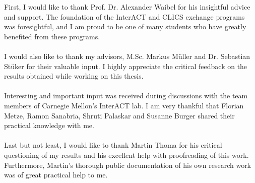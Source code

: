 \acks

First, I would like to thank Prof. Dr. Alexander Waibel for his insightful advice and support. The foundation of the InterACT and CLICS exchange programs was foresightful, and I am proud to be one of many students who have greatly benefited from these programs. \\ \\
I would also like to thank my advisors, M.Sc. Markus Müller and Dr. Sebastian Stüker for their valuable input. I highly appreciate the critical feedback on the results obtained while working on this thesis. \\ \\
Interesting and important input was received during discussions with the team members of Carnegie Mellon's InterACT lab. I am very thankful that Florian Metze, Ramon Sanabria, Shruti Palaskar and Susanne Burger shared their practical knowledge with me. \\ \\
Last but not least, I would like to thank Martin Thoma for his critical questioning of my results and his excellent help with proofreading of this work. Furthermore, Martin's thorough public documentation of his own research work was of great practical help to me. 